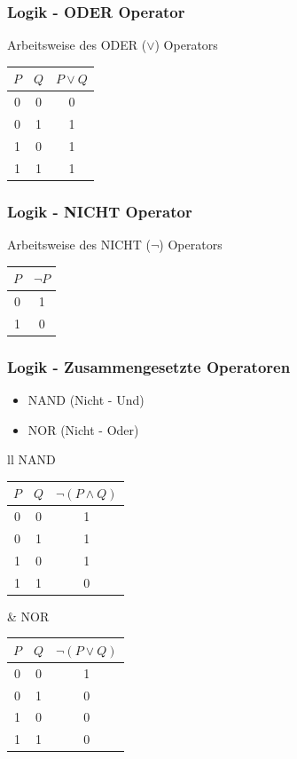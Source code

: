 \documentclass{beamer}
\begin{document}
\frame
{
	\frametitle{Logik - ODER Operator}
	Arbeitsweise des ODER ($\lor$) Operators\\
	\vspace{3mm}
	\begin{tabular}{c|c|c}
	$P$ & $Q$ & $P \lor Q$ \\
	\hline
	0 & 0 & 0 \\
	0 & 1 & 1 \\
	1 & 0 & 1 \\
	1 & 1 & 1
	\end{tabular}
}

\frame
{
	\frametitle{Logik - NICHT Operator}
	Arbeitsweise des NICHT ($\lnot$) Operators\\
	\vspace{3mm}
	\begin{tabular}{c|c}
	$P$ & $\lnot P$ \\
	\hline
	0 & 1 \\
	1 & 0
	\end{tabular}
}

\frame
{
	\frametitle{Logik - Zusammengesetzte Operatoren}
	\begin{itemize}
    \item NAND (Nicht - Und)
    \item NOR (Nicht - Oder)
    \end{itemize}
    \begin{tabular}{ll}
    NAND
    \begin{tabular}{c|c|c}
	$P$ & $Q$ & $\lnot(P \land Q)$ \\
	\hline
	0 & 0 & 1 \\
	0 & 1 & 1 \\
	1 & 0 & 1 \\
	1 & 1 & 0
	\end{tabular}
    &
    NOR
    \begin{tabular}{c|c|c}
	$P$ & $Q$ & $\lnot(P \lor Q)$ \\
	\hline
	0 & 0 & 1 \\
	0 & 1 & 0 \\
	1 & 0 & 0 \\
	1 & 1 & 0
	\end{tabular}
    \end{tabular}
}
\end{document}
